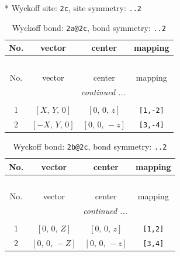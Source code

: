 \documentclass[fleqn,8pt]{jsarticle}
\begin{document}
* Wyckoff site: {\tt 2c}, site symmetry: {\tt ..2}
\renewcommand{\arraystretch}{1.2}
\begin{longtable}{cccc}
\caption{Wyckoff bond: {\tt 2a@2c}, bond symmetry: {\tt ..2}}
 \\
 \hline \hline
No. & vector & center & mapping \\ \hline \endfirsthead

\multicolumn{3}{l}{\tablename\ \thetable{}} \\
 \hline \hline
No. & vector & center & mapping \\ \hline \endhead

 \hline \hline
\multicolumn{3}{r}{\footnotesize\it continued ...} \\ \endfoot

 \hline \hline
\multicolumn{3}{r}{} \\ \endlastfoot

1 & $\left[ X,\, Y,\, 0 \right]$ & $\left[ 0,\, 0,\, z \right]$ & {\tt [1,-2]} \\ \hline
2 & $\left[ - X,\, Y,\, 0 \right]$ & $\left[ 0,\, 0,\, - z \right]$ & {\tt [3,-4]} \\
\end{longtable}
\renewcommand{\arraystretch}{1.2}
\begin{longtable}{cccc}
\caption{Wyckoff bond: {\tt 2b@2c}, bond symmetry: {\tt ..2}}
 \\
 \hline \hline
No. & vector & center & mapping \\ \hline \endfirsthead

\multicolumn{3}{l}{\tablename\ \thetable{}} \\
 \hline \hline
No. & vector & center & mapping \\ \hline \endhead

 \hline \hline
\multicolumn{3}{r}{\footnotesize\it continued ...} \\ \endfoot

 \hline \hline
\multicolumn{3}{r}{} \\ \endlastfoot

1 & $\left[ 0,\, 0,\, Z \right]$ & $\left[ 0,\, 0,\, z \right]$ & {\tt [1,2]} \\ \hline
2 & $\left[ 0,\, 0,\, - Z \right]$ & $\left[ 0,\, 0,\, - z \right]$ & {\tt [3,4]} \\
\end{longtable}
\renewcommand{\arraystretch}{1.2}
\end{document}
